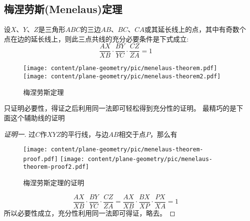 \subsection{梅涅劳斯(Menelaus)定理}
\label{sec:menelaus-theorem}

\begin{theorem}[梅涅劳斯定理]
  设$X$、$Y$、$Z$是三角形$ABC$的三边$AB$、$BC$、$CA$或其延长线上的点，其中有奇数个点在边的延长线上，则此三点共线的充分必要条件是下式成立:
  \begin{equation}
    \label{eq:menelaus-theorem}
    \frac{AX}{XB} \cdot \frac{BY}{YC} \cdot \frac{CZ}{ZA} = 1
 \end{equation}
\end{theorem}
 
\begin{figure}[htbp]
\centering
\texttt{[image: content/plane-geometry/pic/menelaus-theorem.pdf]}
\texttt{[image: content/plane-geometry/pic/menelaus-theorem2.pdf]}
\caption{梅涅劳斯定理}
\label{fig:menelaus-theorem}
\end{figure}
 

只证明必要性，得证之后利用同一法即可轻松得到充分性的证明。
最精巧的是下面这个辅助线的证明
\begin{proof}[证明一]
  过$C$作$XYZ$的平行线，与边$AB$相交于点$P$，那么有
 
\begin{figure}[htbp]
\centering
\texttt{[image: content/plane-geometry/pic/menelaus-theorem-proof.pdf]}
\texttt{[image: content/plane-geometry/pic/menelaus-theorem-proof2.pdf]}
\caption{梅涅劳斯定理的证明}
\label{fig:menelaus-theorem-proof}
\end{figure}
 

  \begin{equation*}
    \frac{AX}{XB} \cdot \frac{BY}{YC} \cdot \frac{CZ}{ZA} =
    \frac{AX}{XB} \cdot \frac{BX}{XP} \cdot \frac{PX}{XA} = 1
  \end{equation*}
所以必要性成立，充分性利用同一法即可得证，略去。
\end{proof}

